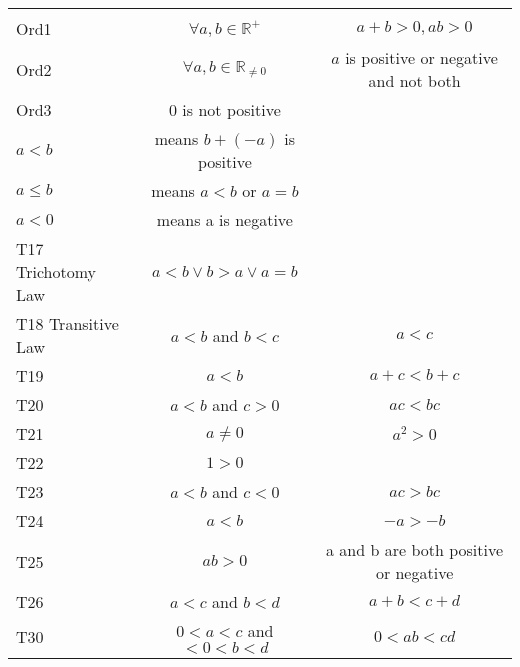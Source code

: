 \documentclass[a4paper]{article}
\theoremstyle{definition}
\begin{document}

\begin{tabular} {|l|c|c|}
  \hline & & \\
  Ord1 & $\forall a,b \in \mathbb{R}^+$ & $a + b > 0, ab > 0$\\
  Ord2 & $\forall a,b \in \mathbb{R}_{\not = 0}$ & $a$ is positive or negative and not both\\
  Ord3 & 0 is not positive & \\
  $a < b$ & means $b + (-a)$ is positive & \\
  $a \leq b$ & means $a < b$ or $a = b$ & \\
  $a < 0$ & means a is negative& \\
  T17 Trichotomy Law & $a < b \lor b > a \lor a = b$ & \\
  T18 Transitive Law & $a < b$ and $b < c$ & $a < c$\\
  T19 & $a < b$ & $a + c < b + c$ \\
  T20 & $a < b$ and $c > 0$ & $ac < bc$ \\
  T21 & $a \not = 0$ & $a^2 > 0$ \\
  T22 & $1 > 0$ &  \\
  T23 & $a < b$ and $c < 0$ & $ac > bc$ \\
  T24 & $a < b$ & $-a > -b$ \\
  T25 & $ab > 0$ & a and b are both positive or negative \\
  T26 & $a < c$ and $b < d$ & $a+b < c+d$ \\
  T30 & $0 < a < c$ and $<0 < b < d$ & $0 < ab < cd$ \\
\end{tabular}
\end{document}
